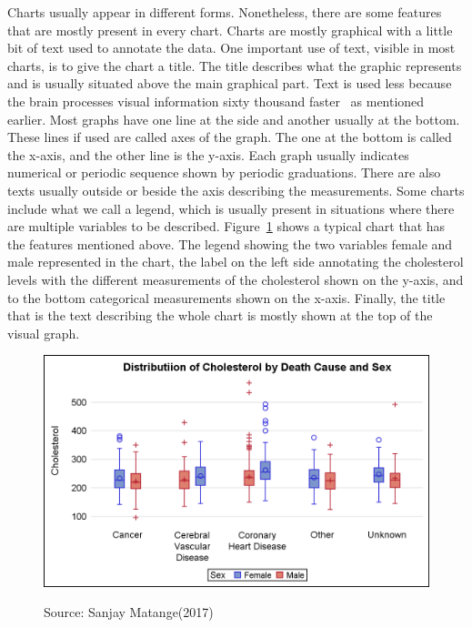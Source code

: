 \documentclass[12pt, a4paper,oneside]{report}
\newcommand{\source}[1]{\vspace{-3pt} \caption*{ Source: {#1}} }
\begin{document}
Charts usually appear in different forms. Nonetheless, there are some features that are mostly present in every chart. Charts are mostly graphical with a little bit of text used to annotate the data. One important use of text, visible in most charts, is to give the chart a title. The title describes what the graphic represents and is usually situated above the main graphical part. Text is used less because the brain processes visual information sixty thousand faster~\cite{humaneye} as mentioned earlier. Most graphs have one line at the side and another usually at the bottom. These lines if used are called axes of the graph. The one at the bottom is called the x-axis, and the other line is the y-axis. Each graph usually indicates numerical or periodic sequence shown by periodic graduations. There are also texts usually outside or beside the axis describing the measurements.
Some charts include what we call a legend, which is usually present in situations where there are multiple variables to be described. Figure~\ref{fig:boxy} shows a typical chart that has the features mentioned above. The legend showing the two variables female and male represented in the chart, the label on the left side annotating the cholesterol levels with the different measurements of the cholesterol shown on the y-axis, and to the bottom categorical measurements shown on the x-axis. Finally, the title that is the text describing the whole chart is mostly shown at the top of the visual graph. 

\begin{figure}[!htb]
	\centering	
	\includegraphics [scale=1.0] {box_color.png}
	\label{fig:boxy}
	\source{Sanjay Matange(2017)~\cite{boxy}}
	
\end{figure}
\end{document}
